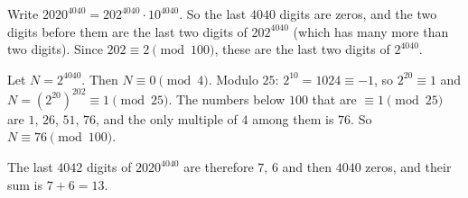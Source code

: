 Write $2020^{4040}=202^{4040}\cdot10^{4040}$. So the last $4040$ digits are zeros, and the two digits before them are the last two digits of $202^{4040}$ (which has many more than two digits). Since $202\equiv2\pmod{100}$, these are the last two digits of $2^{4040}$.

Let $N=2^{4040}$. Then $N\equiv0\pmod4$. Modulo $25$: $2^{10}=1024\equiv-1$, so $2^{20}\equiv1$ and $N=\left(2^{20}\right)^{202}\equiv1\pmod{25}$. The numbers below $100$ that are $\equiv1\pmod{25}$ are $1$, $26$, $51$, $76$, and the only multiple of $4$ among them is $76$. So $N\equiv76\pmod{100}$.

The last $4042$ digits of $2020^{4040}$ are therefore $7$, $6$ and then $4040$ zeros, and their sum is $7+6=\boxed{13}$.
